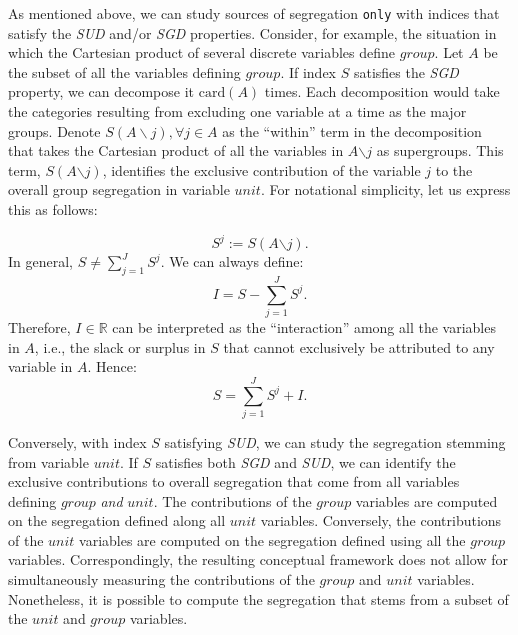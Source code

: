 As mentioned above, we can study sources of segregation \texttt{only} with indices that satisfy the \textit{SUD} and/or \textit{SGD} properties. Consider, for example, the situation in which the Cartesian product of several discrete variables define $group$. Let $A$ be the subset of all the variables defining $group$. If index $S$ satisfies the \textit{SGD} property, we can decompose it $\text{card}(A)$ times. Each decomposition would take the categories resulting from excluding one variable at a time as the major groups. Denote $S(A\backslash j),\forall j\in A$ as the ``within'' term in the decomposition that takes the Cartesian product of all the variables in $A{\backslash j}$ as supergroups. This term, $S(A{\backslash j})$, identifies the exclusive contribution of the variable $j$ to the overall group segregation in variable $unit$. For notational simplicity, let us express this as follows:

\begin{equation}
    S^j:=S\left(A{\backslash j}\right).
    \label{eq:contribution_j}
\end{equation}
In general, $S\neq\sum_{j=1}^{J}S^j$. We can always define:
\begin{equation}
    I = S - \sum_{j=1}^{J}S^j.
    \label{eq: interaction-term-definition}
\end{equation}
Therefore, $I\in \mathbb{R}$ can be interpreted as the ``interaction'' among all the variables in $A$, i.e., the slack or surplus in $S$ that cannot exclusively be attributed to any variable in $A$. Hence:
\begin{equation}
    S =  \sum_{j=1}^{J}S^j + I.
    \label{eq: SGD-property}
\end{equation}

Conversely, with index $S$ satisfying \textit{SUD}, we can study the segregation stemming from variable $unit$. If $S$ satisfies both \textit{SGD} and \textit{SUD}, we can identify the exclusive contributions to overall segregation that come from all variables defining $group$ \textit{and} $unit$.
The contributions of the $group$ variables are computed on the segregation defined along all $unit$ variables. Conversely, the contributions of the $unit$ variables are computed on the segregation defined using all the $group$ variables. Correspondingly, the resulting conceptual framework does not allow for simultaneously measuring the contributions of the $group$ and $unit$ variables. Nonetheless, it is possible to compute the segregation that stems from a subset of the $unit$ and $group$ variables.

